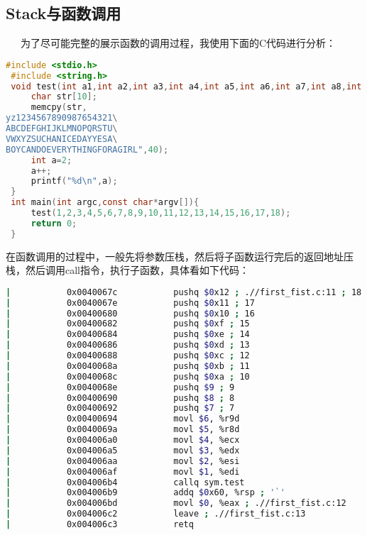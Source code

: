 \documentclass[12pt]{article}  %
\begin{document}
\subsection{Stack与函数调用}
\label{sec:组织你的文本}
\ \ \ 为了尽可能完整的展示函数的调用过程，我使用下面的C代码进行分析：\par
\begin{lstlisting}[language=c]
 #include <stdio.h>
 #include <string.h>
 void test(int a1,int a2,int a3,int a4,int a5,int a6,int a7,int a8,int a9,int a10,int a11,int a12,int a13,int a14,int a15,int a16,int a17,int a18){
     char str[10];
     memcpy(str,                                                                 "abcdefghijklmnopqrstuvwx\
yz1234567890987654321\
ABCDEFGHIJKLMNOPQRSTU\
VWXYZSUCHANICEDAYYESA\
BOYCANDOEVERYTHINGFORAGIRL",40);
     int a=2;
     a++;
     printf("%d\n",a);
 }
 int main(int argc,const char*argv[]){
     test(1,2,3,4,5,6,7,8,9,10,11,12,13,14,15,16,17,18);
     return 0;
 }

\end{lstlisting}\par
在函数调用的过程中，一般先将参数压栈，然后将子函数运行完后的返回地址压栈，然后调用call指令，执行子函数，具体看如下代码：
\begin{lstlisting}[language=sh]
|           0x0040067c           pushq $0x12 ; .//first_fist.c:11 ; 18
|           0x0040067e           pushq $0x11 ; 17
|           0x00400680           pushq $0x10 ; 16
|           0x00400682           pushq $0xf ; 15
|           0x00400684           pushq $0xe ; 14
|           0x00400686           pushq $0xd ; 13
|           0x00400688           pushq $0xc ; 12
|           0x0040068a           pushq $0xb ; 11
|           0x0040068c           pushq $0xa ; 10
|           0x0040068e           pushq $9 ; 9
|           0x00400690           pushq $8 ; 8
|           0x00400692           pushq $7 ; 7
|           0x00400694           movl $6, %r9d
|           0x0040069a           movl $5, %r8d
|           0x004006a0           movl $4, %ecx
|           0x004006a5           movl $3, %edx
|           0x004006aa           movl $2, %esi
|           0x004006af           movl $1, %edi
|           0x004006b4           callq sym.test
|           0x004006b9           addq $0x60, %rsp ; '`'
|           0x004006bd           movl $0, %eax ; .//first_fist.c:12
|           0x004006c2           leave ; .//first_fist.c:13
|           0x004006c3           retq
\end{lstlisting}\par\par
\end{document}
